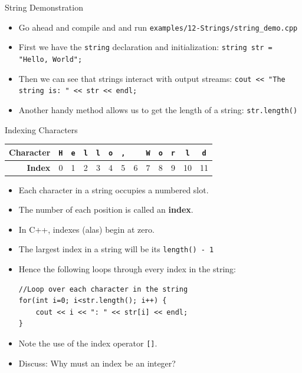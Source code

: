 \documentclass[]{beamer}
\begin{document}
\begin{frame}{String Demonstration}
    \begin{itemize}[<+->]
        \item Go ahead and compile and and run
          \texttt{examples/12-Strings/string\_demo.cpp}
        \item First we have the \texttt{string} declaration and
            initialization:
            \newline\texttt{string str = "Hello, World";}
        \item Then we can see that strings interact with output
            streams:
            \newline\texttt{cout << "The string is: " << str << endl;}
        \item Another handy method allows us to get the length of
            a string:
            \newline\texttt{str.length()}
    \end{itemize}
\end{frame}

\begin{frame}[fragile]{Indexing Characters}

    \begin{tabular}{|r|c|c|c|c|c|c|c|c|c|c|c|c|}
    \hline
    \textbf{Character} & \texttt{H} & \texttt{e} & \texttt{l} & \texttt{l} & \texttt{o} & \texttt{,} & \texttt{ } & \texttt{W} & \texttt{o} & \texttt{r} & \texttt{l} & \texttt{d} \\ 
    \hline 
    \textbf{Index} & 0 & 1 & 2 & 3 & 4 & 5 & 6 & 7 & 8 & 9 & 10 & 11 \\ 
    \hline
    \end{tabular}

    \begin{itemize}[<+->]
        \item Each character in a string occupies a numbered slot.
        \item The number of each position is called an \textbf{index}.
        \item In C++, indexes (alas) begin at zero.
        \item The largest index in a string will be its
            \texttt{length() - 1}
        \item Hence the following loops through every index in the
            string:
\begin{verbatim}
//Loop over each character in the string
for(int i=0; i<str.length(); i++) {
    cout << i << ": " << str[i] << endl;
}
\end{verbatim}
        \item Note the use of the index operator \texttt{[]}.
        \item Discuss: Why must an index be an integer? 
    \end{itemize}
\end{frame}
\end{document}
